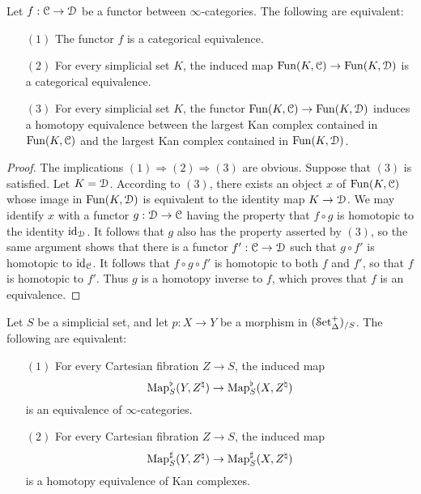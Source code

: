 \begin{lemma}\label{hoopsp}
Let $f: \operatorname{\mathcal{C}} \rightarrow \operatorname{\mathcal{D}}$ be a functor between $\infty$-categories.
The following are equivalent:
\begin{itemize}
\item[$(1)$] The functor $f$ is a categorical equivalence.
\item[$(2)$] For every simplicial set $K$, the induced map
$\operatorname{Fun}(K,\operatorname{\mathcal{C}}) \rightarrow \operatorname{Fun}(K,\operatorname{\mathcal{D}})$ is a categorical equivalence.
\item[$(3)$] For every simplicial set $K$, the functor $\operatorname{Fun}(K,\operatorname{\mathcal{C}}) \rightarrow \operatorname{Fun}(K,\operatorname{\mathcal{D}})$ induces
a homotopy equivalence between the largest Kan complex contained in $\operatorname{Fun}(K,\operatorname{\mathcal{C}})$ and the largest Kan complex contained in $\operatorname{Fun}(K,\operatorname{\mathcal{D}})$.
\end{itemize}
\end{lemma}

\begin{proof}
The implications $(1) \Rightarrow (2) \Rightarrow (3)$ are obvious. Suppose that $(3)$ is satisfied.
Let $K = \operatorname{\mathcal{D}}$. According to $(3)$, there exists an object $x$ of $\operatorname{Fun}(K,\operatorname{\mathcal{C}})$ whose image
in $\operatorname{Fun}(K,\operatorname{\mathcal{D}})$ is equivalent to the identity map $K \rightarrow \operatorname{\mathcal{D}}$. We may identify
$x$ with a functor $g: \operatorname{\mathcal{D}} \rightarrow \operatorname{\mathcal{C}}$ having the property that $f \circ g$ is homotopic
to the identity $\operatorname{id}_{\operatorname{\mathcal{D}}}$. It follows that $g$ also has the property asserted by $(3)$, so the same argument shows that there is a functor $f': \operatorname{\mathcal{C}} \rightarrow \operatorname{\mathcal{D}}$ such that
$g \circ f'$ is homotopic to $\operatorname{id}_{\operatorname{\mathcal{C}}}$. It follows that $f \circ g \circ f'$ is homotopic to both
$f$ and $f'$, so that $f$ is homotopic to $f'$. Thus $g$ is a homotopy inverse to $f$, which proves that $f$ is an equivalence.
\end{proof}

\begin{proposition}\label{markdefeq}
Let $S$ be a simplicial set, and let $p: X \rightarrow Y$ be a morphism in $(\operatorname{\mathcal{S}et_{\Delta}^{+}})_{/S}$. The following are equivalent:
\begin{itemize}
\item[$(1)$] For every Cartesian fibration $Z \rightarrow S$, the induced map 
$$ \operatorname{{Map}}^{\flat}_{S}(Y, Z^{\natural}) \rightarrow \operatorname{{Map}}^{\flat}_{S}(X, Z^{\natural})$$ is an
equivalence of $\infty$-categories.
\item[$(2)$] For every Cartesian fibration $Z \rightarrow S$, the induced map
$$ \operatorname{{Map}}^{\sharp}_{S}(Y, Z^{\natural}) \rightarrow \operatorname{{Map}}^{\sharp}_{S}(X, Z^{\natural})$$ is a homotopy equivalence of Kan complexes.
\end{itemize}
\end{proposition}

